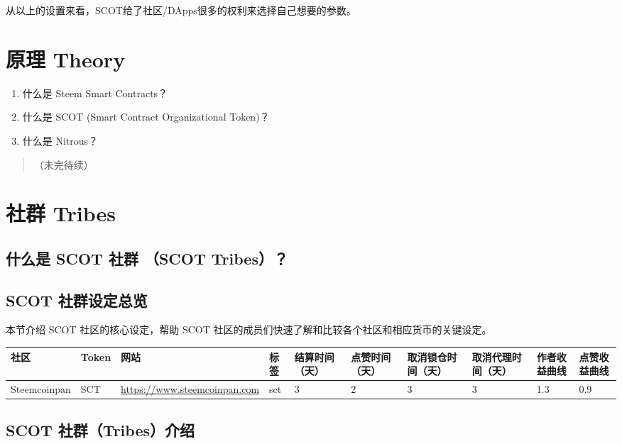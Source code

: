 \documentclass[]{ctexbook}
\providecommand{\tightlist}{%
  \setlength{\itemsep}{0pt}\setlength{\parskip}{0pt}}
\begin{document}
从以上的设置来看，SCOT给了社区/DApps很多的权利来选择自己想要的参数。

\hypertarget{theory}{%
\chapter{原理 Theory}\label{theory}}

\begin{enumerate}
\def\labelenumi{\arabic{enumi}.}
\tightlist
\item
  什么是 Steem Smart Contracts？
\item
  什么是 SCOT (Smart Contract Organizational Token)？
\item
  什么是 Nitrous？
\end{enumerate}

\begin{quote}
（未完待续）
\end{quote}

\hypertarget{tribes}{%
\chapter{社群 Tribes}\label{tribes}}

\hypertarget{whats-tribes}{%
\section{什么是 SCOT 社群 （SCOT Tribes）？}\label{whats-tribes}}

\hypertarget{tribes-config}{%
\section{SCOT 社群设定总览}\label{tribes-config}}

本节介绍 SCOT 社区的核心设定，帮助 SCOT 社区的成员们快速了解和比较各个社区和相应货币的关键设定。

\begin{longtable}[]{@{}llllllllll@{}}
\toprule
社区 & Token & 网站 & 标签 & 结算时间（天） & 点赞时间（天） & 取消锁仓时间（天） & 取消代理时间（天） & 作者收益曲线 & 点赞收益曲线\tabularnewline
\midrule
\endhead
Steemcoinpan & SCT & \url{https://www.steemcoinpan.com} & sct & 3 & 2 & 3 & 3 & 1.3 & 0.9\tabularnewline
\bottomrule
\end{longtable}

\hypertarget{intro-to-tribes}{%
\section{SCOT 社群（Tribes）介绍}\label{intro-to-tribes}}
\end{document}
